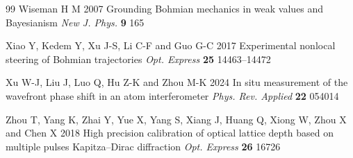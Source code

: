 \documentclass[11pt,a4paper]{article}
\begin{document}
\begin{thebibliography}{99}
Wiseman H M 2007 Grounding Bohmian mechanics in weak values and Bayesianism \textit{New J. Phys.} \textbf{9} 165

Xiao Y, Kedem Y, Xu J-S, Li C-F and Guo G-C 2017 Experimental nonlocal steering of Bohmian trajectories \textit{Opt. Express} \textbf{25} 14463--14472

Xu W-J, Liu J, Luo Q, Hu Z-K and Zhou M-K 2024 In situ measurement of the wavefront phase shift in an atom interferometer \textit{Phys. Rev. Applied} \textbf{22} 054014

Zhou T, Yang K, Zhai Y, Yue X, Yang S, Xiang J, Huang Q, Xiong W, Zhou X and Chen X 2018 High precision calibration of optical lattice depth based on multiple pulses Kapitza--Dirac diffraction \textit{Opt. Express} \textbf{26} 16726
\end{thebibliography}
\end{document}

